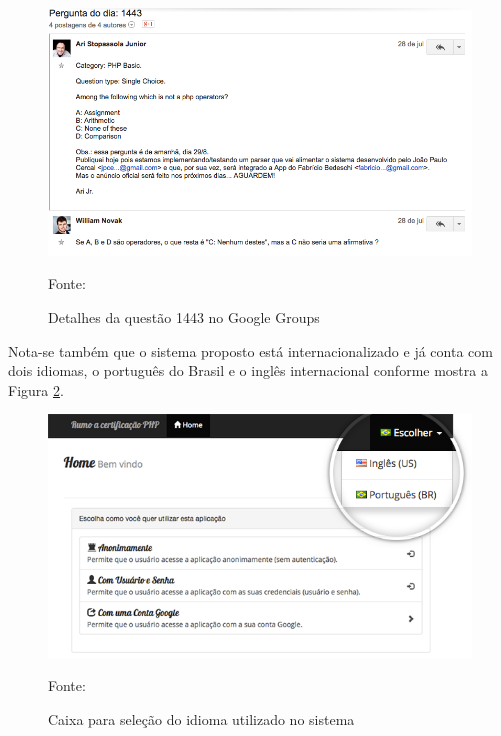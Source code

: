 \begin{figure}[h!tb]
	\caption{Detalhes da questão 1443 no Google Groups}
	\label{fig:zcpePerguntaDetalhesGoogleGroups}

	\centering
	\includegraphics[width=\textwidth]{images/resultados/google-groups-pergunta-1443.png}

	\centering
	\footnotesize Fonte: \fonteOAutor
\end{figure}

\FloatBarrier 	%
				
Nota-se também que o sistema proposto está internacionalizado e já conta com
dois idiomas, o português do Brasil e o inglês internacional conforme mostra a
Figura \ref{fig:zcpeIdioma}.

\begin{figure}[h!tb]
	\caption{Caixa para seleção do idioma utilizado no sistema}
	\label{fig:zcpeIdioma}

	\centering
	\includegraphics[width=\textwidth]{images/resultados/zcpe-idioma.png}

	\centering
	\footnotesize Fonte: \fonteOAutor
\end{figure}

\FloatBarrier 	%
